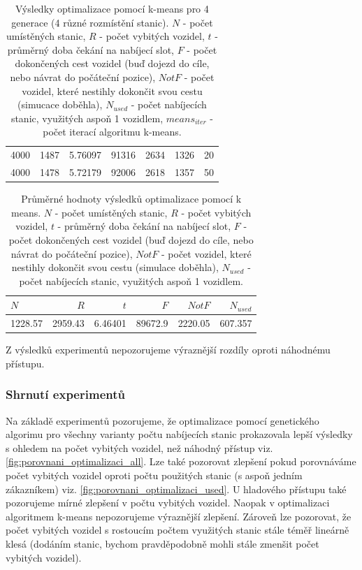 \begin{table}
\begin{tabular}{lrrrrrr}
4000 & 1487 & 5.76097 & 91316 & 2634 & 1326 & 20 \\
4000 & 1478 & 5.72179 & 92006 & 2618 & 1357 & 50 \\
\bottomrule
\end{tabular}
\caption{Výsledky optimalizace pomocí k-means pro 4 generace (4 různé rozmístění stanic).
$N$ - počet umístěných stanic, $R$ - počet vybitých vozidel, $t$ - průměrný doba čekání na nabíjecí slot, $F$ - počet dokončených
cest vozidel (buď dojezd do cíle, nebo návrat do počáteční pozice), $Not F$ - počet vozidel, které nestihly
dokončit svou cestu (simucace doběhla), $N_{used}$ - počet nabíjecích stanic, využitých aspoň 1 vozidlem, 
$means_{iter}$ - počet iterací algoritmu k-means.}
\label{tab:vysledky_kmeans}
\end{table}


\begin{table}
\centering\footnotesize\sf
\begin{tabular}{lrrrrr}
\toprule
$N$ & $R$ & $t$ & $F$ & $Not F$ & $N_{used}$ \\
\midrule
1228.57 & 2959.43 & 6.46401 & 89672.9 & 2220.05 & 607.357 \\
\bottomrule
\end{tabular}
\caption{Průměrné hodnoty výsledků optimalizace pomocí k means.
$N$ - počet umístěných stanic, $R$ - počet vybitých vozidel, $t$ - průměrný doba čekání na nabíjecí slot, $F$ - počet dokončených
cest vozidel (buď dojezd do cíle, nebo návrat do počáteční pozice), $Not F$ - počet vozidel, které nestihly
dokončit svou cestu (simulace doběhla), $N_{used}$ - počet nabíjecích stanic, využitých aspoň 1 vozidlem.}
\label{tab:prumery_kmeans}
\end{table}

Z výsledků experimentů nepozorujeme výraznější rozdíly oproti náhodnému přístupu. 


\subsubsection{Shrnutí experimentů}
Na základě experimentů pozorujeme, že optimalizace pomocí genetického algorimu pro všechny varianty 
počtu nabíjecích stanic prokazovala lepší výsledky s ohledem na počet vybitých
vozidel, než náhodný přístup viz. \cref{fig:porovnani_optimalizaci_all}.
Lze také pozorovat zlepšení pokud porovnáváme počet vybitých vozidel
oproti počtu použitých stanic (s aspoň jedním zákazníkem) viz. \cref{fig:porovnani_optimalizaci_used}.
U hladového přístupu také pozorujeme mírné zlepšení v počtu vybitých vozidel.
Naopak v optimalizaci algoritmem k-means nepozorujeme výraznější zlepšení.
Zároveň lze pozorovat, že počet vybitých vozidel s rostoucím počtem využitých stanic stále
téměř lineárně klesá (dodáním stanic, bychom pravděpodobně mohli stále zmenšit počet vybitých vozidel).



